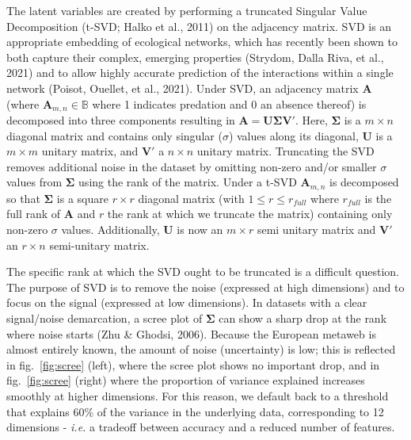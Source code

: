 \documentclass[10pt,oneside]{article}
\begin{document}
The latent variables are created by performing a truncated Singular
Value Decomposition (t-SVD; Halko et al., 2011) on the adjacency matrix.
SVD is an appropriate embedding of ecological networks, which has
recently been shown to both capture their complex, emerging properties
(Strydom, Dalla Riva, et al., 2021) and to allow highly accurate
prediction of the interactions within a single network (Poisot, Ouellet,
et al., 2021). Under SVD, an adjacency matrix \(\mathbf{A}\) (where
\(\mathbf{A}_{m,n}\in\mathbb{B}\) where 1 indicates predation and 0 an
absence thereof) is decomposed into three components resulting in
\(\mathbf{A} = \mathbf{U}\mathbf{\Sigma}\mathbf{V'}.\) Here,
\(\mathbf{\Sigma}\) is a \(m \times n\) diagonal matrix and contains
only singular (\(\sigma\)) values along its diagonal, \(\mathbf{U}\) is
a \(m \times m\) unitary matrix, and \(\mathbf{V}'\) a \(n \times n\)
unitary matrix. Truncating the SVD removes additional noise in the
dataset by omitting non-zero and/or smaller \(\sigma\) values from
\(\mathbf{\Sigma}\) using the rank of the matrix. Under a t-SVD
\(\mathbf{A}_{m,n}\) is decomposed so that \(\mathbf{\Sigma}\) is a
square \(r \times r\) diagonal matrix (with \(1 \le r \le r_{full}\)
where \(r_{full}\) is the full rank of \(\mathbf{A}\) and \(r\) the rank
at which we truncate the matrix) containing only non-zero \(\sigma\)
values. Additionally, \(\mathbf{U}\) is now an \(m \times r\) semi
unitary matrix and \(\mathbf{V}'\) an \(r \times n\) semi-unitary
matrix.

The specific rank at which the SVD ought to be truncated is a difficult
question. The purpose of SVD is to remove the noise (expressed at high
dimensions) and to focus on the signal (expressed at low dimensions). In
datasets with a clear signal/noise demarcation, a scree plot of
\(\mathbf{\Sigma}\) can show a sharp drop at the rank where noise starts
(Zhu \& Ghodsi, 2006). Because the European metaweb is almost entirely
known, the amount of noise (uncertainty) is low; this is reflected in
fig.~\ref{fig:scree} (left), where the scree plot shows no important
drop, and in fig.~\ref{fig:scree} (right) where the proportion of
variance explained increases smoothly at higher dimensions. For this
reason, we default back to a threshold that explains 60\% of the
variance in the underlying data, corresponding to 12 dimensions -
\emph{i.e.} a tradeoff between accuracy and a reduced number of
features.
\end{document}
